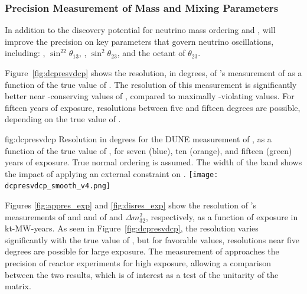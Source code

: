 \subsubsection{Precision Measurement of Mass and Mixing Parameters}

In addition to the discovery potential for neutrino mass ordering and , 
 will improve the precision on key parameters that govern neutrino oscillations, including: \deltacp, $\sin^22\theta_{13}$, , $\sin^2\theta_{23}$, and the octant of $\theta_{23}$. 

Figure~\ref{fig:dcpresvdcp} shows the resolution, in degrees, of 's measurement of \deltacp as a function of the true value of \deltacp. The resolution of this measurement is significantly better near -conserving values of \deltacp, compared to maximally -violating values. For fifteen years of exposure, resolutions between five and fifteen degrees are possible, depending on the true value of \deltacp. 

\begin{dunefigure}
{fig:dcpresvdcp}
{Resolution in degrees for the DUNE measurement of \deltacp, as a function of the true value of \deltacp, for seven (blue), ten (orange), and fifteen (green) years of exposure. True normal ordering is assumed. The width of the band shows the impact of applying an external constraint on .}
		\texttt{[image: dcpresvdcp\_smooth\_v4.png]}
\end{dunefigure}


Figures \ref{fig:appres_exp} and  \ref{fig:disres_exp} show the resolution of 's measurements of \deltacp and  and of  and $\Delta m^{2}_{32}$, respectively, as a function of exposure in kt-MW-years. As seen in Figure~\ref{fig:dcpresvdcp}, the \deltacp resolution varies significantly with the true value of \deltacp, but for favorable values, resolutions near five degrees are possible for large exposure. The  measurement of  approaches the precision of reactor experiments for high exposure, allowing a comparison between the two results, which is of interest as a test of the unitarity of the  matrix. 

